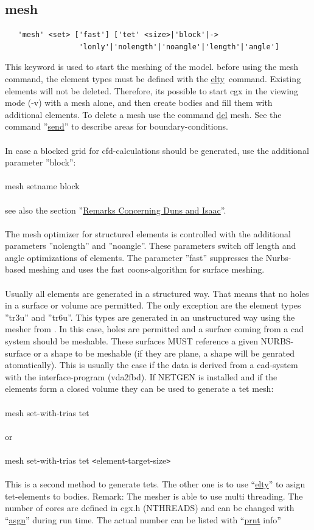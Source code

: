 \documentclass{article}
\providecommand{\htmlref}[2]{\hyperref[#2]{#1}}
\begin{document}
\subsection{\label{mesh}mesh}
\begin{verbatim}
   'mesh' <set> ['fast'] ['tet' <size>|'block'|->
                 'lonly'|'nolength'|'noangle'|'length'|'angle']
\end{verbatim}
This keyword is used to start the meshing of the model. before using the mesh command, the element types must be defined with the \htmlref{elty}{elty}\ command.  Existing elements will not be deleted. Therefore, its possible to start cgx in the viewing mode (-v) with a mesh alone, and then create bodies and fill them with additional elements. To delete a mesh use the command \htmlref{del}{del} mesh. See the command ''\htmlref{send}{send}'' to describe areas for boundary-conditions. 
\\\\In case a blocked grid for cfd-calculations should be generated, use the additional parameter ''block'':
\\\\mesh setname block\\\\ see also the section ''\htmlref{Remarks Concerning Duns and Isaac}{Remarks Concerning Duns and Isaac}''.
\\\\The mesh optimizer for structured elements is controlled with the additional parameters ''nolength'' and ''noangle''. These parameters switch off length and angle optimizations of elements. The parameter ''fast'' suppresses the Nurbs-based meshing and uses the fast coons-algorithm for surface meshing.
\\\\Usually all elements are generated in a structured way. That means that no holes in a surface or volume are permitted. The only exception are the element types ''tr3u'' and ''tr6u''. This types are generated in an unstructured way using the mesher from \cite{mesh2d}. In this case, holes are permitted and a surface coming from a cad system should be meshable. These surfaces MUST reference a given NURBS-surface or a shape to be meshable (if they are plane, a shape will be genrated atomatically). This is usually the case if the data is derived from a cad-system with the interface-program (vda2fbd). If NETGEN \cite{NETGEN} is installed and if the elements form a closed volume they can be used to generate a tet mesh:\\\\mesh set-with-trias tet\\\\or\\\\mesh set-with-trias tet \verb_<_element-target-size\verb_>_\\\\This is a second method to generate tets. The other one is to use ``\htmlref{elty}{elty}'' to asign tet-elements to bodies. Remark: The mesher is able to use multi threading. The number of cores are defined in cgx.h (NTHREADS) and can be changed with ``\htmlref{asgn}{asgn}'' during run time. The actual number can be listed with ``\htmlref{prnt}{prnt} info''
\end{document}

